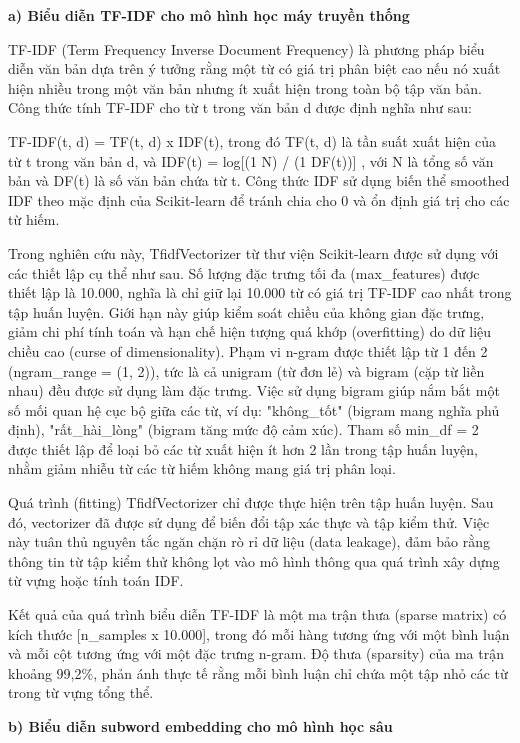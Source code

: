 \documentclass[14pt, a4paper]{report}
\begin{document}
\textbf{a) Biểu diễn TF-IDF cho mô hình học máy truyền thống}


TF-IDF (Term Frequency \- Inverse Document Frequency) là phương pháp biểu diễn văn bản dựa trên ý tưởng rằng một từ có giá trị phân biệt cao nếu nó xuất hiện nhiều trong một văn bản nhưng ít xuất hiện trong toàn bộ tập văn bản. Công thức tính TF-IDF cho từ t trong văn bản d được định nghĩa như sau:


TF-IDF(t, d) = TF(t, d) x IDF(t), trong đó TF(t, d) là tần suất xuất hiện của từ t trong văn bản d, và IDF(t) = log[(1 \+ N) / (1 \+ DF(t))] , với N là tổng số văn bản và DF(t) là số văn bản chứa từ t. Công thức IDF sử dụng biến thể smoothed IDF theo mặc định của Scikit-learn để tránh chia cho 0 và ổn định giá trị cho các từ hiếm.


Trong nghiên cứu này, TfidfVectorizer từ thư viện Scikit-learn được sử dụng với các thiết lập cụ thể như sau. Số lượng đặc trưng tối đa (max\_features) được thiết lập là 10.000, nghĩa là chỉ giữ lại 10.000 từ có giá trị TF-IDF cao nhất trong tập huấn luyện. Giới hạn này giúp kiểm soát chiều của không gian đặc trưng, giảm chi phí tính toán và hạn chế hiện tượng quá khớp (overfitting) do dữ liệu chiều cao (curse of dimensionality). Phạm vi n-gram được thiết lập từ 1 đến 2 (ngram\_range = (1, 2)), tức là cả unigram (từ đơn lẻ) và bigram (cặp từ liền nhau) đều được sử dụng làm đặc trưng. Việc sử dụng bigram giúp nắm bắt một số mối quan hệ cục bộ giữa các từ, ví dụ: "không\_tốt" (bigram mang nghĩa phủ định), "rất\_hài\_lòng" (bigram tăng mức độ cảm xúc). Tham số min\_df = 2 được thiết lập để loại bỏ các từ xuất hiện ít hơn 2 lần trong tập huấn luyện, nhằm giảm nhiễu từ các từ hiếm không mang giá trị phân loại.


Quá trình (fitting) TfidfVectorizer chỉ được thực hiện trên tập huấn luyện. Sau đó, vectorizer đã được sử dụng để biến đổi tập xác thực và tập kiểm thử. Việc này tuân thủ nguyên tắc ngăn chặn rò rỉ dữ liệu (data leakage), đảm bảo rằng thông tin từ tập kiểm thử không lọt vào mô hình thông qua quá trình xây dựng từ vựng hoặc tính toán IDF.


Kết quả của quá trình biểu diễn TF-IDF là một ma trận thưa (sparse matrix) có kích thước [n\_samples x 10.000], trong đó mỗi hàng tương ứng với một bình luận và mỗi cột tương ứng với một đặc trưng n-gram. Độ thưa (sparsity) của ma trận khoảng 99,2\%, phản ánh thực tế rằng mỗi bình luận chỉ chứa một tập nhỏ các từ trong từ vựng tổng thể.


\textbf{b) Biểu diễn subword embedding cho mô hình học sâu}
\end{document}

